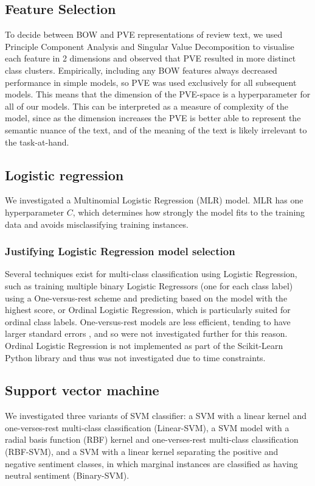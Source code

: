 \documentclass[11pt]{article}
\begin{document}
\subsection{Feature Selection} \label{subsec:method-features}

To decide between BOW and PVE representations of review text, we used Principle Component Analysis and Singular Value Decomposition to visualise each feature in 2 dimensions and observed that PVE resulted in more distinct class clusters. Empirically, including any BOW features always decreased performance in simple models, so PVE was used exclusively for all subsequent models. This means that the dimension of the PVE-space is a hyperparameter for all of our models. This can be interpreted as a measure of complexity of the model, since as the dimension increases the PVE is better able to represent the semantic nuance of the text, and of the meaning of the text is likely irrelevant to the task-at-hand.


\subsection{Logistic regression} \label{subsec:method-lr}
We investigated a Multinomial Logistic Regression (MLR) model. MLR has one hyperparameter $C$, which determines how strongly the model fits to the training data and avoids misclassifying training instances.

\subsubsection*{Justifying Logistic Regression model selection}
Several techniques exist for multi-class classification using Logistic Regression, such as training multiple binary Logistic Regressors (one for each class label) using a One-versus-rest scheme and predicting based on the model with the highest score, or Ordinal Logistic Regression, which is particularly suited for ordinal class labels.
One-versus-rest models are less efficient, tending to have larger standard errors \cite{zbMATH01817585}, and so were not investigated further for this reason.
Ordinal Logistic Regression is not implemented as part of the Scikit-Learn Python library and thus was not investigated due to time constraints.

\subsection{Support vector machine} \label{subsec:method-svm}
We investigated three variants of SVM classifier: a SVM with a linear kernel and one-verses-rest multi-class classification (Linear-SVM), a SVM model with a radial basis function (RBF) kernel and one-verses-rest multi-class classification (RBF-SVM), and a SVM with a linear kernel separating the positive and negative sentiment classes, in which marginal instances are classified as having neutral sentiment (Binary-SVM). 
\end{document}
